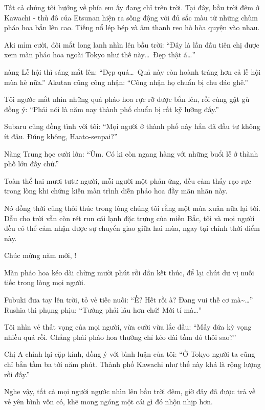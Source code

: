\documentclass[../main.tex]{subfiles}
\begin{document}
Tất cả chúng tôi hướng về phía em ấy đang chỉ trên trời. Tại đây, bầu trời đêm ở Kawachi - thủ đô của Etsunan hiện ra sống động với đủ sắc màu từ những chùm pháo hoa bắn lên cao. Tiếng nổ lép bép và âm thanh reo hò hòa quyện vào nhau.

Aki mỉm cười, đôi mắt long lanh nhìn lên bầu trời: ``Đây là lần đầu tiên chị được xem màn pháo hoa ngoài Tokyo như thế này\dots\ Đẹp thật á\dots''

nàng Lễ hội thì sáng mắt lên: ``Đẹp quá\dots\ Quả này còn hoành tráng hơn cả lễ hội mùa hè nữa.'' Akutan cũng công nhận: ``Công nhận họ chuẩn bị chu đáo ghê.''

Tôi ngước mắt nhìn những quả pháo hoa rực rỡ được bắn lên, rồi cùng gật gù đồng ý: ``Phải nói là năm nay thành phố chuẩn bị rất kỹ lưỡng đấy.''

Subaru cũng đồng tình với tôi: ``Mọi người ở thành phố này hẳn đã đầu tư không ít đâu. Đúng không, Haato-senpai?''

Nàng Trung học cười lớn: ``Ừm. Có ki còn ngang hàng với những buổi lễ ở thành phố lớn đấy chứ.''

Toàn thể hai mươi tưtư người, mỗi người một phản ứng, đều cảm thấy rạo rực trong lòng khi chứng kiến màn trình diễn pháo hoa đầy mãn nhãn này.

Nó đồng thời cũng thôi thúc trong lòng chúng tôi rằng một mùa xuân nữa lại tới. Dẫu cho trời vẫn còn rét run cái lạnh đặc trưng của miền Bắc, tôi và mọi người đều có thể cảm nhận được sự chuyển giao giữa hai mùa, ngay tại chính thời điểm này.

Chúc mừng năm mới, \hll!

\ct

Màn pháo hoa kéo dài chừng mười phút rồi dần kết thúc, để lại chút dư vị nuối tiếc trong lòng mọi người.

Fubuki đưa tay lên trời, tỏ vẻ tiếc nuối: ``Ế? Hết rồi à? Đang vui thế cơ mà\~{}\dots'' Rushia thì phụng phịu: ``Tưởng phải lâu hơn chứ! Mới tí mà\dots''

Tôi nhìn vẻ thất vọng của mọi người, vừa cười vừa lắc đầu: ``Mấy đứa kỳ vọng nhiều quá rồi. Chẳng phải pháo hoa thường chỉ kéo dài tầm đó thôi sao?''

Chị A chỉnh lại cặp kính, đồng ý với bình luận của tôi: ``Ở Tokyo người ta cũng chỉ bắn tầm ba tới năm phút. Thành phố Kawachi như thế này khá là rộng lượng rồi đấy.''

Nghe vậy, tất cả mọi người ngước nhìn lên bầu trời đêm, giờ đây đã được trả về vẻ yên bình vốn có, khẽ mong ngóng một cái gì đó nhộn nhịp hơn.
\end{document}
